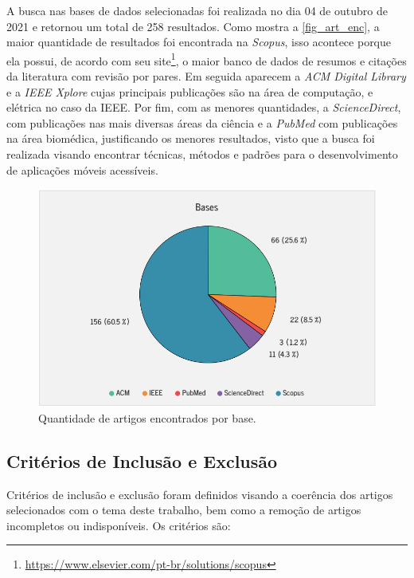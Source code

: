 A busca nas bases de dados selecionadas foi realizada no dia 04 de outubro de 2021 e retornou um total de 258 resultados.
Como mostra a \autoref{fig_art_enc}, a maior quantidade de resultados foi encontrada na \emph{Scopus}, isso acontece porque ela possui, de acordo com seu site\footnote{\url{https://www.elsevier.com/pt-br/solutions/scopus}}, o maior banco de dados de resumos e citações da literatura com revisão por pares.
Em seguida aparecem a \emph{ACM Digital Library} e a \emph{IEEE Xplore} cujas principais publicações são na área de computação, e elétrica no caso da IEEE\@.
Por fim, com as menores quantidades, a \emph{ScienceDirect}, com publicações nas mais diversas áreas da ciência e a \emph{PubMed} com publicações na área biomédica, justificando os menores resultados, visto que a busca foi realizada visando encontrar técnicas, métodos e padrões para o desenvolvimento de aplicações móveis acessíveis.

\begin{figure}[htb]
	\caption{\label{fig_art_enc}Quantidade de artigos encontrados por base.}
	\begin{center}
	    \includegraphics[scale=0.7]{Imagens/msl/artigos_encontrados.png}
	\end{center}
\end{figure}

\subsection{Critérios de Inclusão e Exclusão}

Critérios de inclusão e exclusão foram definidos visando a coerência dos artigos selecionados com o tema deste trabalho, bem como a remoção de artigos incompletos ou indisponíveis.
Os critérios são:

